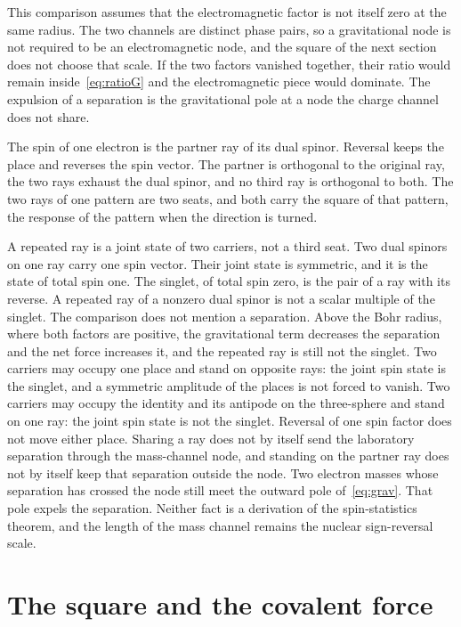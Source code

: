 \documentclass[a4paper]{article}
\begin{document}
This comparison assumes that the electromagnetic factor is not itself zero at the same radius. The two channels are distinct phase pairs, so a gravitational node is not required to be an electromagnetic node, and the square of the next section does not choose that scale. If the two factors vanished together, their ratio would remain inside~\eqref{eq:ratioG} and the electromagnetic piece would dominate. The expulsion of a separation is the gravitational pole at a node the charge channel does not share.

The spin of one electron is the partner ray of its dual spinor. Reversal keeps the place and reverses the spin vector. The partner is orthogonal to the original ray, the two rays exhaust the dual spinor, and no third ray is orthogonal to both. The two rays of one pattern are two seats, and both carry the square of that pattern, the response of the pattern when the direction is turned.

A repeated ray is a joint state of two carriers, not a third seat. Two dual spinors on one ray carry one spin vector. Their joint state is symmetric, and it is the state of total spin one. The singlet, of total spin zero, is the pair of a ray with its reverse. A repeated ray of a nonzero dual spinor is not a scalar multiple of the singlet. The comparison does not mention a separation. Above the Bohr radius, where both factors are positive, the gravitational term decreases the separation and the net force increases it, and the repeated ray is still not the singlet. Two carriers may occupy one place and stand on opposite rays: the joint spin state is the singlet, and a symmetric amplitude of the places is not forced to vanish. Two carriers may occupy the identity and its antipode on the three-sphere and stand on one ray: the joint spin state is not the singlet. Reversal of one spin factor does not move either place. Sharing a ray does not by itself send the laboratory separation through the mass-channel node, and standing on the partner ray does not by itself keep that separation outside the node. Two electron masses whose separation has crossed the node still meet the outward pole of~\eqref{eq:grav}. That pole expels the separation. Neither fact is a derivation of the spin-statistics theorem, and the length of the mass channel remains the nuclear sign-reversal scale.

\section{The square and the covalent force}
\label{sec:covalent}
\end{document}
